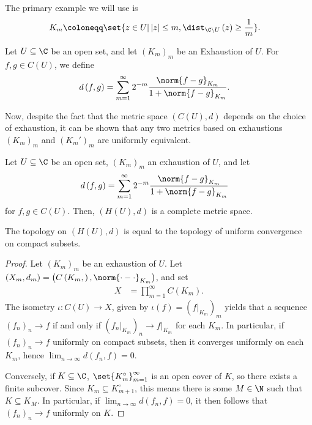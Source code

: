 \documentclass[10pt]{mypackage}
\renewcommand{\coloneq}{\coloneqq}
\begin{document}
The primary example we will use is
\begin{align*}
  K_m &\coloneq \set{z\in U | \left\vert z \right\vert\leq m,\dist_{\C\setminus U}\left( z \right) \geq \frac{1}{m}}.
\end{align*}
\begin{definition}
  Let $U\subseteq \C$ be an open set, and let $\left( K_m \right)_m$ be an Exhaustion of $U$. For $f,g\in C\left( U \right)$, we define
  \begin{align*}
    d\left( f,g \right) &= \sum_{m=1}^{\infty}2^{-m} \frac{\norm{f-g}_{K_m}}{1 + \norm{f-g}_{K_m}}.
  \end{align*}
\end{definition}
Now, despite the fact that the metric space $\left( C(U),d \right)$ depends on the choice of exhaustion, it can be shown that any two metrics based on exhaustions $\left( K_m \right)_m$ and $\left( K_m' \right)_m$ are uniformly equivalent.
\begin{theorem}
  Let $U\subseteq \C$ be an open set, $\left( K_m \right)_m$ an exhaustion of $U$, and let
  \begin{align*}
    d\left( f,g \right) &= \sum_{m=1}^{\infty}2^{-m} \frac{\norm{f-g}_{K_m}}{1 + \norm{f-g}_{K_m}}
  \end{align*}
  for $f,g\in C(U)$. Then, $\left( H\left( U \right),d \right)$ is a complete metric space.
\end{theorem}
\begin{proposition}
  The topology on $\left( H\left( U \right),d \right)$ is equal to the topology of uniform convergence on compact subsets.
\end{proposition}
\begin{proof}
  Let $\left( K_m \right)_m$ be an exhaustion of $U$. Let $\left( X_m,d_m \right) = \left( C\left( K_m, \right),\norm{\cdot-\cdot}_{K_m} \right)$, and set
  \begin{align*}
    X &= \prod_{m=1}^{\infty}C\left( K_m \right).
  \end{align*}
  The isometry $\iota\colon C\left( U \right)\rightarrow X$, given by $\iota(f) = \left( f|_{K_m} \right)_m$ yields that a sequence $\left( f_n \right)_n\rightarrow f$ if and only if $\left( f_n|_{K_m} \right)_n\rightarrow f|_{K_m}$ for each $K_m$. In particular, if $\left( f_n \right)_n\rightarrow f$ uniformly on compact subsets, then it converges uniformly on each $K_m$, hence $\lim_{n\rightarrow\infty}d\left( f_n,f \right) = 0$.%

  Conversely, if $K\subseteq \C$, $\set{K_m^{\circ}}_{m=1}^{\infty}$ is an open cover of $K$, so there exists a finite subcover. Since $K_m\subseteq K_{m+1}^{\circ}$, this means there is some $M\in \N$ such that $K\subseteq K_M$. In particular, if $\lim_{n\rightarrow\infty}d\left( f_n,f \right)= 0$, it then follows that $\left( f_n \right)_n\rightarrow f$ uniformly on $K$.
\end{proof}
\end{document}
